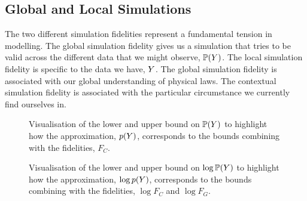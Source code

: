 \documentclass[]{article}
\begin{document}
\subsection{Global and Local Simulations}

The two different simulation fidelities represent a fundamental
tension in modelling. The global simulation fidelity gives us a
simulation that tries to be valid across the different data that we
might observe, $\mathbb{P}(Y)$. The local simulation
fidelity is specific to the data we have, $Y$. The global
simulation fidelity is associated with our global understanding of
physical laws. The contextual simulation fidelity is associated with
the particular circumstance we currently find ourselves in.



\begin{figure}
    \centering
    \def\svgwidth{\textwidth}
   
    \caption{Visualisation of the lower and upper bound on
      $\mathbb{P}(Y)$ to highlight how the approximation,
      $p(Y)$, corresponds to the bounds
      combining with the fidelities, $F_C$.}
    \label{fig-py-bounds}
\end{figure}



\begin{figure}
  \centering
  \def\svgwidth{\textwidth}
    
    \caption{Visualisation of the lower and upper bound on $\log
      \mathbb{P}(Y)$ to highlight how the approximation,
      $\log p(Y)$, corresponds to the bounds
      combining with the fidelities, $\log F_C$ and $\log F_G$.}
    \label{fig-log-py-bounds}
\end{figure}
\end{document}
